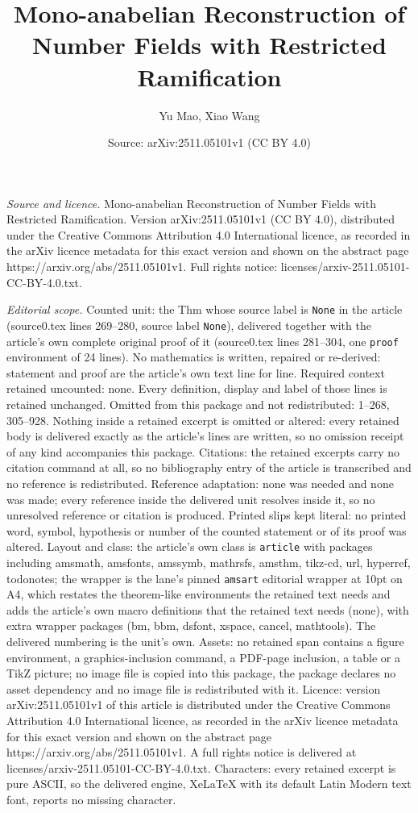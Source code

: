 \documentclass[10pt,a4paper]{amsart}
\title[Mono-anabelian Reconstruction of Number Fields with Restrict]{Mono-anabelian Reconstruction of Number Fields with Restricted Ramification}
\author{Yu Mao, Xiao Wang}
\date{Source: arXiv:2511.05101v1 (CC BY 4.0)}
\begin{document}
\maketitle

\noindent\emph{Source and licence.} Mono-anabelian Reconstruction of Number Fields with Restricted Ramification. Version arXiv:2511.05101v1 (CC BY 4.0), distributed under the Creative Commons Attribution 4.0 International licence, as recorded in the arXiv licence metadata for this exact version and shown on the abstract page https://arxiv.org/abs/2511.05101v1. Full rights notice: licenses/arxiv-2511.05101-CC-BY-4.0.txt.\par\smallskip

\noindent\textit{Editorial scope.} Counted unit: the Thm whose source label is \texttt{None} in the article (source0.tex lines 269--280, source label \texttt{None}), delivered together with the article's own complete original proof of it (source0.tex lines 281--304, one \texttt{proof} environment of 24 lines). No mathematics is written, repaired or re-derived: statement and proof are the article's own text line for line. Required context retained uncounted: none. Every definition, display and label of those lines is retained unchanged. Omitted from this package and not redistributed: 1--268, 305--928. Nothing inside a retained excerpt is omitted or altered: every retained body is delivered exactly as the article's lines are written, so no omission receipt of any kind accompanies this package. Citations: the retained excerpts carry no citation command at all, so no bibliography entry of the article is transcribed and no reference is redistributed. Reference adaptation: none was needed and none was made; every reference inside the delivered unit resolves inside it, so no unresolved reference or citation is produced. Printed slips kept literal: no printed word, symbol, hypothesis or number of the counted statement or of its proof was altered. Layout and class: the article's own class is \texttt{article} with packages including amsmath, amsfonts, amssymb, mathrsfs, amsthm, tikz-cd, url, hyperref, todonotes; the wrapper is the lane's pinned \texttt{amsart} editorial wrapper at 10pt on A4, which restates the theorem-like environments the retained text needs and adds the article's own macro definitions that the retained text needs (none), with extra wrapper packages (bm, bbm, dsfont, xspace, cancel, mathtools). The delivered numbering is the unit's own. Assets: no retained span contains a figure environment, a graphics-inclusion command, a PDF-page inclusion, a table or a TikZ picture; no image file is copied into this package, the package declares no asset dependency and no image file is redistributed with it. Licence: version arXiv:2511.05101v1 of this article is distributed under the Creative Commons Attribution 4.0 International licence, as recorded in the arXiv licence metadata for this exact version and shown on the abstract page https://arxiv.org/abs/2511.05101v1. A full rights notice is delivered at licenses/arxiv-2511.05101-CC-BY-4.0.txt. Characters: every retained excerpt is pure ASCII, so the delivered engine, XeLaTeX with its default Latin Modern text font, reports no missing character.
\end{document}
